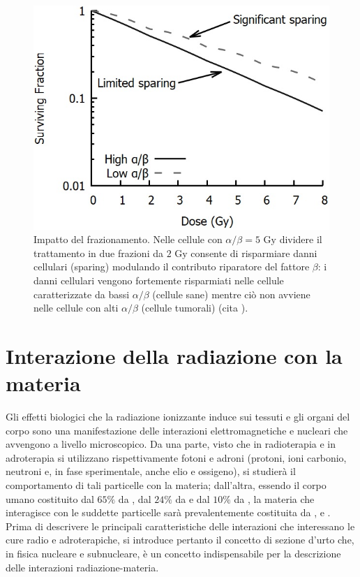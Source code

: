 \documentclass[12pt,a4paper,twoside]{report}
\begin{document}
	\begin{figure}[H]
		\centering
		\includegraphics[width=0.9\linewidth]{sparing.jpg}
		\caption{Impatto del frazionamento. Nelle cellule con $\alpha/\beta=5\mbox{ Gy}$ dividere il trattamento in due frazioni da $2\mbox{ Gy}$ consente di risparmiare danni cellulari (sparing) modulando il contributo riparatore del fattore $\beta$: i danni cellulari vengono fortemente risparmiati nelle cellule caratterizzate da bassi $\alpha/\beta$ (cellule sane) mentre ciò non avviene nelle cellule con alti $\alpha/\beta$ (cellule tumorali) (cita
			).}
		\label{fig:sparing}
	\end{figure}
	
	\section{Interazione della radiazione con la materia}
	Gli effetti biologici che la radiazione ionizzante induce sui tessuti e gli organi del corpo sono una manifestazione delle interazioni elettromagnetiche e nucleari che avvengono a livello microscopico. Da una parte, visto che in radioterapia e in adroterapia si utilizzano rispettivamente fotoni e adroni (protoni, ioni carbonio, neutroni e, in fase sperimentale, anche elio e ossigeno), si studierà il comportamento di tali particelle con la materia; dall'altra, essendo il corpo umano costituito dal $65\%$ da , dal $24\%$ da  e dal $10\%$ da , la materia che interagisce con le suddette particelle sarà prevalentemente costituita da ,  e . Prima di descrivere le principali caratteristiche delle interazioni che interessano le cure radio e adroterapiche, si introduce pertanto il concetto di sezione d'urto che, in fisica nucleare e subnucleare, è un concetto indispensabile per la descrizione delle interazioni radiazione-materia.
	
\end{document}
